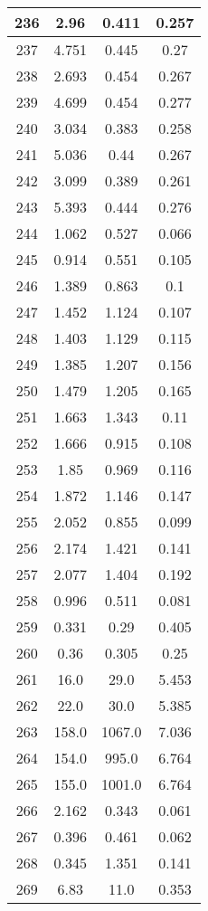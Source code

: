 \begin{table}[H]
\begin{tabular}{|c|c|c|c|}
\hline
236 & 2.96 & 0.411 & 0.257 \\
\hline
237 & 4.751 & 0.445 & 0.27 \\
\hline
238 & 2.693 & 0.454 & 0.267 \\
\hline
239 & 4.699 & 0.454 & 0.277 \\
\hline
240 & 3.034 & 0.383 & 0.258 \\
\hline
241 & 5.036 & 0.44 & 0.267 \\
\hline
242 & 3.099 & 0.389 & 0.261 \\
\hline
243 & 5.393 & 0.444 & 0.276 \\
\hline
244 & 1.062 & 0.527 & 0.066 \\
\hline
245 & 0.914 & 0.551 & 0.105 \\
\hline
246 & 1.389 & 0.863 & 0.1 \\
\hline
247 & 1.452 & 1.124 & 0.107 \\
\hline
248 & 1.403 & 1.129 & 0.115 \\
\hline
249 & 1.385 & 1.207 & 0.156 \\
\hline
250 & 1.479 & 1.205 & 0.165 \\
\hline
251 & 1.663 & 1.343 & 0.11 \\
\hline
252 & 1.666 & 0.915 & 0.108 \\
\hline
253 & 1.85 & 0.969 & 0.116 \\
\hline
254 & 1.872 & 1.146 & 0.147 \\
\hline
255 & 2.052 & 0.855 & 0.099 \\
\hline
256 & 2.174 & 1.421 & 0.141 \\
\hline
257 & 2.077 & 1.404 & 0.192 \\
\hline
258 & 0.996 & 0.511 & 0.081 \\
\hline
259 & 0.331 & 0.29 & 0.405 \\
\hline
260 & 0.36 & 0.305 & 0.25 \\
\hline
261 & 16.0 & 29.0 & 5.453 \\
\hline
262 & 22.0 & 30.0 & 5.385 \\
\hline
263 & 158.0 & 1067.0 & 7.036 \\
\hline
264 & 154.0 & 995.0 & 6.764 \\
\hline
265 & 155.0 & 1001.0 & 6.764 \\
\hline
266 & 2.162 & 0.343 & 0.061 \\
\hline
267 & 0.396 & 0.461 & 0.062 \\
\hline
268 & 0.345 & 1.351 & 0.141 \\
\hline
269 & 6.83 & 11.0 & 0.353 \\

\end{tabular}
\end{table}
